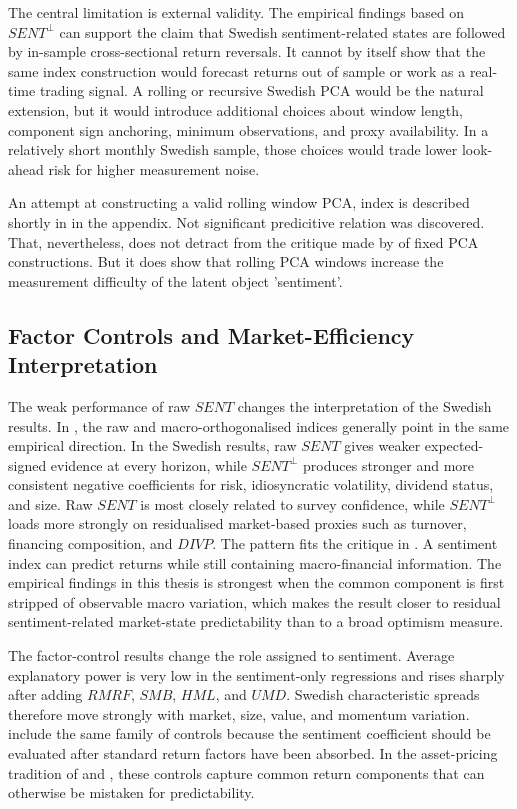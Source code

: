 \documentclass[11pt]{article}
\newcommand{\var}[1]{\ensuremath{#1}}
\begin{document}
The central limitation is external validity. The empirical findings based on \var{SENT^{\perp}} can support the claim that Swedish sentiment-related states are followed by in-sample cross-sectional return reversals. It cannot by itself show that the same index construction would forecast returns out of sample or work as a real-time trading signal. A rolling or recursive Swedish PCA would be the natural extension, but it would introduce additional choices about window length, component sign anchoring, minimum observations, and proxy availability. In a relatively short monthly Swedish sample, those choices would trade lower look-ahead risk for higher measurement noise. 

An attempt at constructing a valid rolling window PCA, index is described shortly in  in the appendix. Not significant predicitive relation was discovered. That, nevertheless, does not detract from the critique made by \citet{ung2024enhanced} of fixed PCA constructions. But it does show that rolling PCA windows increase the measurement difficulty of the latent object 'sentiment'.

\subsection{Factor Controls and Market-Efficiency Interpretation}
The weak performance of raw \var{SENT} changes the interpretation of the Swedish results. In \citet{baker2006sentiment}, the raw and macro-orthogonalised indices generally point in the same empirical direction. In the Swedish results, raw \var{SENT} gives weaker expected-signed evidence at every horizon, while \var{SENT^{\perp}} produces stronger and more consistent negative coefficients for risk, idiosyncratic volatility, dividend status, and size. Raw \var{SENT} is most closely related to survey confidence, while \var{SENT^{\perp}} loads more strongly on residualised market-based proxies such as turnover, financing composition, and \var{DIVP}. The pattern fits the critique in \citet{sibley2012sentimental}. A sentiment index can predict returns while still containing macro-financial information. The empirical findings in this thesis is strongest when the common component is first stripped of observable macro variation, which makes the result closer to residual sentiment-related market-state predictability than to a broad optimism measure.

The factor-control results change the role assigned to sentiment. Average explanatory power is very low in the sentiment-only regressions and rises sharply after adding \var{RMRF}, \var{SMB}, \var{HML}, and \var{UMD}. Swedish characteristic spreads therefore move strongly with market, size, value, and momentum variation. \citet{baker2006sentiment} include the same family of controls because the sentiment coefficient should be evaluated after standard return factors have been absorbed. In the asset-pricing tradition of \citet{fama1993common} and \citet{carhart1997persistence}, these controls capture common return components that can otherwise be mistaken for predictability.
\end{document}

